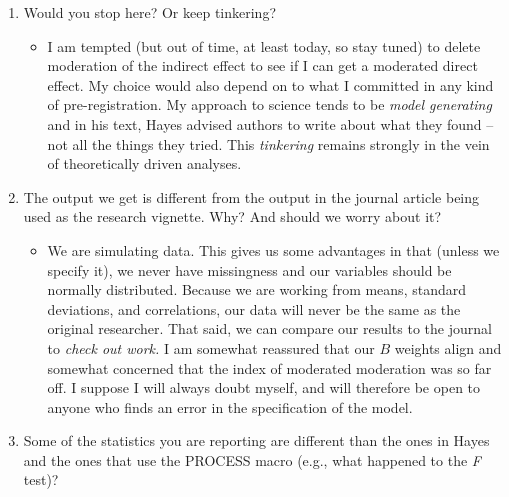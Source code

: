 \documentclass[
  11pt,
]{book}
\providecommand{\tightlist}{%
  \setlength{\itemsep}{0pt}\setlength{\parskip}{0pt}}
\begin{document}
\begin{enumerate}
\def\labelenumi{\arabic{enumi}.}
\tightlist
\item
  Would you stop here? Or keep tinkering?

  \begin{itemize}
  \tightlist
  \item
    I am tempted (but out of time, at least today, so stay tuned) to delete moderation of the indirect effect to see if I can get a moderated direct effect. My choice would also depend on to what I committed in any kind of pre-registration. My approach to science tends to be \emph{model generating} \citep{bollen_testing_1993} and in his text, Hayes \citeyearpar{hayes_introduction_2018} advised authors to write about what they found -- not all the things they tried. This \emph{tinkering} remains strongly in the vein of theoretically driven analyses.
  \end{itemize}
\item
  The output we get is different from the output in the journal article being used as the research vignette. Why? And should we worry about it?

  \begin{itemize}
  \tightlist
  \item
    We are simulating data. This gives us some advantages in that (unless we specify it), we never have missingness and our variables should be normally distributed. Because we are working from means, standard deviations, and correlations, our data will never be the same as the original researcher. That said, we can compare our results to the journal to \emph{check out work.} I am somewhat reassured that our \(B\) weights align and somewhat concerned that the index of moderated moderation was so far off. I suppose I will always doubt myself, and will therefore be open to anyone who finds an error in the specification of the model.
  \end{itemize}
\item
  Some of the statistics you are reporting are different than the ones in Hayes and the ones that use the PROCESS macro (e.g., what happened to the \emph{F} test)?


\end{enumerate}
\end{document}
